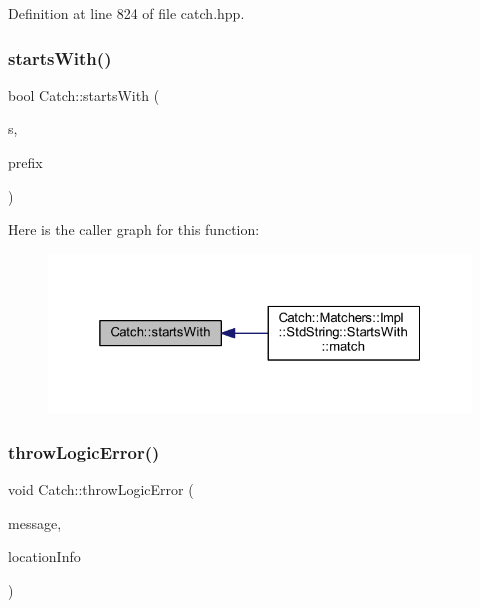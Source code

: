Definition at line 824 of file catch.\+hpp.

\hypertarget{namespace_catch_a695f62327be0676e046291eeaae15110}{}\label{namespace_catch_a695f62327be0676e046291eeaae15110} 
\subsubsection{\texorpdfstring{starts\+With()}{startsWith()}}
{\footnotesize\ttfamily bool Catch\+::starts\+With (\begin{DoxyParamCaption}\item[{std\+::string const \&}]{s,  }\item[{std\+::string const \&}]{prefix }\end{DoxyParamCaption})}

Here is the caller graph for this function\+:\nopagebreak
\begin{figure}[H]
\begin{center}
\leavevmode
\includegraphics[width=325pt]{namespace_catch_a695f62327be0676e046291eeaae15110_icgraph}
\end{center}
\end{figure}
\hypertarget{namespace_catch_a702b612f683d154c466ea8297ed4a20d}{}\label{namespace_catch_a702b612f683d154c466ea8297ed4a20d} 
\subsubsection{\texorpdfstring{throw\+Logic\+Error()}{throwLogicError()}}
{\footnotesize\ttfamily void Catch\+::throw\+Logic\+Error (\begin{DoxyParamCaption}\item[{std\+::string const \&}]{message,  }\item[{\hyperlink{struct_catch_1_1_source_line_info}{Source\+Line\+Info} const \&}]{location\+Info }\end{DoxyParamCaption})}

